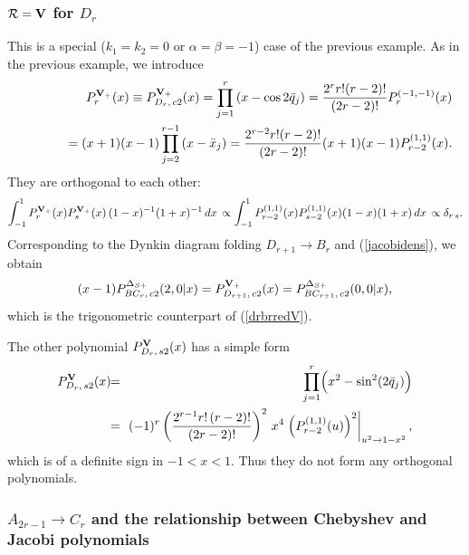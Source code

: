 \documentclass[a4paper,12pt]{article}
\begin{document}
\subsubsection{${\cal R}={\bf V}$ for $D_r$}

This is a special ($k_1=k_2=0$ or $\alpha=\beta=-1$) case of the previous
example. As in the previous example, we introduce
\begin{eqnarray}
   &&P_r^{{\bf V}_+}(x)\equiv P_{D_r,\,c2}^{{\bf V}_+}(x)=
   \prod_{j=1}^{r}\left(x-\cos2\bar{q}_j\right)
   ={2^{r}r!(r-2)!\over{(2r-2)!}}P_{r}^{(-1,-1)}(x)\nonumber\\
%
   &&\qquad\quad=(x+1)(x-1)\prod_{j=2}^{r-1}\left(x-\bar{x}_j\right)
   ={2^{r-2}r!(r-2)!\over{(2r-2)!}}(x+1)(x-1)P_{r-2}^{(1,1)}(x).
   \label{jacobidens}
\end{eqnarray}
They are orthogonal to each other:
\begin{equation}
   \int_{-1}^1 P_r^{{\bf V}_+}(x)P_s^{{\bf V}_+}(x)\,(1-x)^{-1}(1+x)^{-1}\,dx\,
   \propto \int_{-1}^1 P_{r-2}^{(1,1)}(x)P_{s-2}^{(1,1)}(x)(1-x)(1+x)
   \,dx\,
   \propto\delta_{r\,s}.
\end{equation}
Corresponding to the  Dynkin diagram folding
$D_{r+1}\to B_r$ and (\ref{jacobidens}), we obtain
\begin{equation}
   (x-1)  P_{BC_r,\,c2}^{\Delta_{S+}}(2,0|x)=
   P_{D_{r+1},\,c2}^{{\bf V}_+}(x)=P_{BC_{r+1},\,c2}^{\Delta_{S+}}(0,0|x),
\end{equation}
which is the trigonometric counterpart of (\ref{drbrredV}).

The other polynomial $P_{D_r,\,s2}^{\bf V}(x)$ has a simple form
\begin{eqnarray}
   P_{D_r,\,s2}^{\bf V}(x)&\!\!=\!\!&
   \prod_{j=1}^{r}\Bigl(x^2-\sin^2(2\bar{q}_j)\Bigr)\nonumber\\
%
   &\!\!=\!\!&(-1)^r\left({2^{r-1}r!\,(r-2)!\over (2r-2)!}\right)^2\,
   x^4\left.\left(P_{r-2}^{(1,1)}(u)\right)^2\right|_{u^2\to 1-x^2},
   \label{drs2j}
\end{eqnarray}
which is of a definite sign in $-1< x< 1$. Thus they do not form any
orthogonal polynomials.

\subsubsection{$A_{2r-1}\to C_r$ and the relationship between Chebyshev
and Jacobi polynomials}
\end{document}
